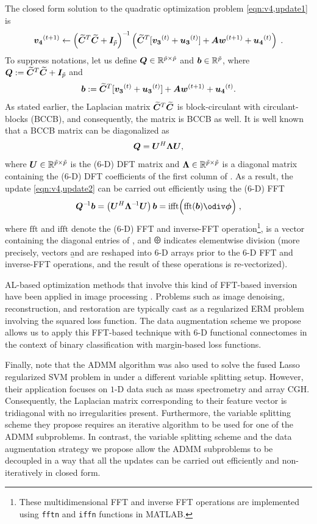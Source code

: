 The closed form solution to the quadratic optimization problem \eqref{eqn:v4,update1} is 
\begin{equation}
	{\ensuremath{\bm{v_4}}}^{(t+1)} \leftarrow \left({\bm{\widetilde{C}}}^T{\bm{\widetilde{C}}} + {\bm{I}}_{\tilde{p}}\right)^{-\!1}
		\left({\bm{\widetilde{C}}}^T[{\bm{v_3}}^{(t)}+{\bm{u_3}}^{(t)}]+{\bm{A}}{\bm{w}}^{(t+1)}+{\bm{u_4}}^{(t)}\right) \;.
	\label{eqn:v4,update2}
\end{equation}
To suppress notations, let us define ${\bm{Q}}\in\mathbb{R}^{{\tilde{p}}\times{\ensuremath{\tilde{p}}}}$ and ${\bm{b}}\in\mathbb{R}^{\tilde{p}}$, where
${\bm{Q}}:={\bm{\widetilde{C}}}^T{\bm{\widetilde{C}}} + {\bm{I}}_{\tilde{p}}$
and 
\[{\bm{b}}:={\bm{\widetilde{C}}}^T[{\bm{v_3}}^{(t)}+{\bm{u_3}}^{(t)}]+{\bm{A}}{\bm{w}}^{(t+1)}+{\bm{u_4}}^{(t)} .\]
As stated earlier, the Laplacian matrix ${\bm{\widetilde{C}}}^T{\bm{\widetilde{C}}}$ is block-circulant with circulant-blocks (BCCB), and consequently, the matrix \Q is BCCB as well.  
It is well known that a BCCB matrix can be diagonalized as \citep{Davis:1979:book}
	\[{\bm{Q}}={\bm{U}}^H\bm{\Lambda}{\bm{U}},\]
where ${\bm{U}}\in\mathbb{R}^{{\tilde{p}}\times{\ensuremath{\tilde{p}}}}$ is the ($6$-D) DFT matrix and $\bm{\Lambda}\in\mathbb{R}^{{\tilde{p}}\times{\ensuremath{\tilde{p}}}}$ is a diagonal matrix containing the ($6$-D) DFT coefficients of the first column of \Q .
As a result, the update \eqref{eqn:v4,update2} can be carried out efficiently using the (6-D) FFT 
\begin{equation}
 	\Q\inv\b = 
 		\left(\U^H \BLambda\inv \U\right)\b = 
 		\mathrm{ifft}\Big(	\mathrm{fft}(\b)\odiv\Bphi \Big) \;,
 	\label{eqn:v4,fft}
\end{equation}
where $\text{fft}$ and $\text{ifft}$ denote the ($6$-D) FFT and inverse-FFT operation\footnote{These multidimensional FFT and inverse FFT operations are implemented using \texttt{fftn} and \texttt{iffn} functions in MATLAB.}, \Bphi is a vector containing the diagonal entries of \BLambda, and $\odiv$ indicates elementwise division 
(more precisely, vectors \b and \Bphi are reshaped into $6$-D arrays prior to the $6$-D FFT and inverse-FFT operations, and the result of these operations is re-vectorized).

AL-based optimization methods that involve this kind of FFT-based inversion have been applied in image processing \citep{Afonso:2010,Allison:2013, Matakos:2013}.
Problems such as image denoising, reconstruction, and restoration are typically cast as a regularized ERM problem involving the squared loss function.
The data augmentation scheme we propose allows us to apply this FFT-based technique with $6$-D functional connectomes in the context of binary classification with margin-based loss functions. 

Finally, note that the ADMM algorithm was also used to solve the fused Lasso regularized SVM problem in \citep{Gui-Bo-Ye:2011} under a different variable splitting setup.
However, their application focuses on $1$-D data such as mass spectrometry and array CGH.
Consequently, the Laplacian matrix corresponding to their feature vector is tridiagonal with no irregularities present.
Furthermore, the variable splitting scheme they propose requires an iterative algorithm to be used for one of the ADMM subproblems.
In contrast, the variable splitting scheme and the data augmentation strategy we propose allow the ADMM subproblems to be decoupled in a way that all the updates can be carried out efficiently and non-iteratively in closed form.

